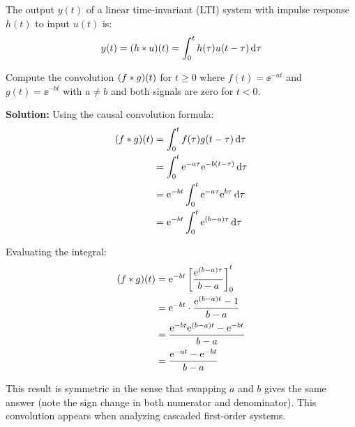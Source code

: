 \begin{keyconceptbox}[title=Convolution in Control Systems]
The output $y(t)$ of a linear time-invariant (LTI) system with impulse response $h(t)$ to input $u(t)$ is:
\begin{equation}
y(t) = (h \ast u)(t) = \int_0^t h(\tau) u(t - \tau) \, \mathrm{d}\tau
\end{equation}
\end{keyconceptbox}

\begin{examplebox}[title=Convolution of Two Exponentials]
Compute the convolution $(f \ast g)(t)$ for $t \geq 0$ where $f(t) = \ee^{-at}$ and $g(t) = \ee^{-bt}$ with $a \neq b$ and both signals are zero for $t < 0$.

\textbf{Solution:} Using the causal convolution formula:
\begin{align}
(f \ast g)(t) &= \int_0^t f(\tau) g(t - \tau) \, \mathrm{d}\tau \\
&= \int_0^t \mathrm{e}^{-a\tau} \mathrm{e}^{-b(t-\tau)} \, \mathrm{d}\tau \\
&= \mathrm{e}^{-bt} \int_0^t \mathrm{e}^{-a\tau} \mathrm{e}^{b\tau} \, \mathrm{d}\tau \\
&= \mathrm{e}^{-bt} \int_0^t \mathrm{e}^{(b-a)\tau} \, \mathrm{d}\tau
\end{align}

Evaluating the integral:
\begin{align}
(f \ast g)(t) &= \mathrm{e}^{-bt} \left[ \frac{\mathrm{e}^{(b-a)\tau}}{b-a} \right]_0^t \\
&= \mathrm{e}^{-bt} \cdot \frac{\mathrm{e}^{(b-a)t} - 1}{b-a} \\
&= \frac{\mathrm{e}^{-bt} \mathrm{e}^{(b-a)t} - \mathrm{e}^{-bt}}{b-a} \\
&= \frac{\mathrm{e}^{-at} - \mathrm{e}^{-bt}}{b-a}
\end{align}

This result is symmetric in the sense that swapping $a$ and $b$ gives the same answer (note the sign change in both numerator and denominator). This convolution appears when analyzing cascaded first-order systems.
\end{examplebox}



